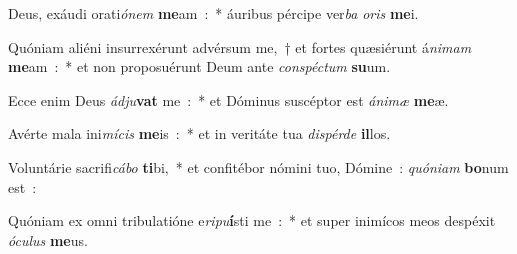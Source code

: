 ﻿\item Deus, exáudi orati\emph{ó}\emph{nem} \textbf{me}am~:~* áuribus pércipe ver\emph{ba} \emph{o}\emph{ris} \textbf{me}i.
\item Quóniam aliéni insurrexérunt advérsum me,~† et fortes quæsiérunt á\emph{ni}\emph{mam} \textbf{me}am~:~* et non proposuérunt Deum ante \emph{con}\emph{spé}\emph{ctum} \textbf{su}um.
\item Ecce enim Deus \emph{ád}\emph{ju}\textbf{vat} me~:~* et Dóminus suscéptor est \emph{á}\emph{ni}\emph{mæ} \textbf{me}æ.
\item Avérte mala ini\emph{mí}\emph{cis} \textbf{me}is~:~* et in veritáte tua \emph{di}\emph{spér}\emph{de} \textbf{il}los.
\item Voluntárie sacrifi\emph{cá}\emph{bo} \textbf{ti}bi,~* et confitébor nómini tuo, Dómine~: \emph{quó}\emph{ni}\emph{am} \textbf{bo}num est~:
\item Quóniam ex omni tribulatióne e\emph{ri}\emph{pu}\textbf{í}sti me~:~* et super inimícos meos despéxit \emph{ó}\emph{cu}\emph{lus} \textbf{me}us.